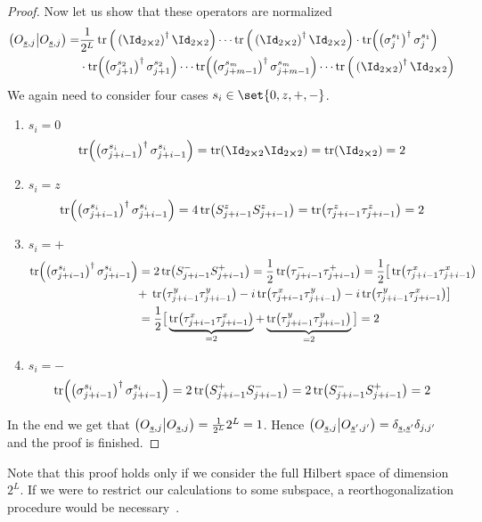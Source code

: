 \begin{proof}
    Now let us show that these operators are normalized
    \begin{align}
        \hs{O_{\underline{s},j}}{O_{\underline{s},j}} =& \frac{1}{2^L} 
        \tr\Big(\left(\Id_{2\cross 2}\right)^{\dagger}\Id_{2\cross 2}\Big) \cdots 
        \tr\Big(\left(\Id_{2\cross 2}\right)^{\dagger}\Id_{2\cross 2}\Big)
        \cdot \tr(\left(\sigma_j^{s_1}\right)^{\dagger} \sigma_j^{s_1})\nonumber\\ 
        &\cdot \tr(\left(\sigma_{j+1}^{s_2}\right)^{\dagger} \sigma_{j+1}^{s_2})
        \cdots \tr(\left(\sigma_{j+m-1}^{s_m}\right)^{\dagger} \sigma_{j+m-1}^{s_m}) \cdots 
        \tr\Big(\left(\Id_{2\cross 2}\right)^{\dagger}\Id_{2\cross 2}\Big)
    \end{align}
    We again need to consider four cases \(s_i\in \set{0,z,+,-}\).
    \begin{enumerate}
        \item {\(s_i = 0\)
        \begin{equation*}
            \tr(\left(\sigma_{j+i-1}^{s_i}\right)^{\dagger} \sigma_{j+i-1}^{s_i}) = \tr(\Id_{2\cross 2}\Id_{2\cross 2}) = 
            \tr(\Id_{2\cross 2}) = 2
        \end{equation*}
        }
        \item {\(s_i = z\)
        \begin{equation*}
            \tr(\left(\sigma_{j+i-1}^{s_i}\right)^{\dagger} \sigma_{j+i-1}^{s_i}) = 4\tr(S^{z}_{j+i-1} S^{z}_{j+i-1}) = 
            \tr(\tau_{j+i-1}^{z} \tau_{j+i-1}^{z}) = 2
        \end{equation*}
        }
        \item { \(s_i = +\)
        \begin{align*}
            \tr(\left(\sigma_{j+i-1}^{s_i}\right)^{\dagger} \sigma_{j+i-1}^{s_i}) =& \;2\tr(S^{-}_{j+i-1} S^{+}_{j+i-1}) =
            \frac{1}{2} \tr(\tau^{-}_{j+i-1}\tau^{+}_{j+i-1})  
            =\frac{1}{2} \big[\tr(\tau^{x}_{j+i-1}\tau^{x}_{j+i-1})\\
            +\;&\tr(\tau^{y}_{j+i-1}\tau^{y}_{j+i-1})
            - i\tr(\tau^{x}_{j+i-1}\tau^{y}_{j+i-1}) -i\tr(\tau^{y}_{j+i-1}\tau^{x}_{j+i-1})\big] \\
            =&\; \frac{1}{2}\big[  \underbrace{\tr(\tau^{x}_{j+i-1}\tau^{x}_{j+i-1})}_{=2}
            +\underbrace{\tr(\tau^{y}_{j+i-1}\tau^{y}_{j+i-1})}_{=2} \big] = 2
        \end{align*}
        }
        \item { \(s_i = -\)
        \begin{align*}
            \tr(\left(\sigma_{j+i-1}^{s_i}\right)^{\dagger} \sigma_{j+i-1}^{s_i}) =
             2\tr(S^{+}_{j+i-1} S^{-}_{j+i-1}) = 2\tr(S^{-}_{j+i-1} S^{+}_{j+i-1}) = 2 
        \end{align*}
        }
    \end{enumerate}
    In the end we get that \(\left(O_{\underline{s},j} \middle| O_{\underline{s},j}\right) = \frac{1}{2^L}2^L = 1\).
    Hence \( \left(O_{\underline{s},j} \middle| O_{\underline{s}^{\prime},j^{\prime}}\right)
    =\delta_{\underline{s},\underline{s}^{\prime}}\delta_{j,j^{\prime}}\) and the proof is finished.
\end{proof}
Note that this proof holds only if we consider the full Hilbert space of dimension \(2^L\).
If we were to restrict our calculations to some subspace, a reorthogonalization procedure
would be necessary~\autocite{Mierzejewski2015a}.